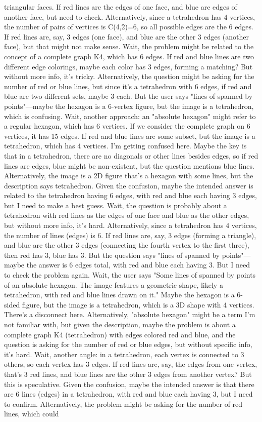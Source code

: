 triangular faces. If red lines are the edges of one face, and blue are edges of another face, but need to check. Alternatively, since a tetrahedron has 4 vertices, the number of pairs of vertices is C(4,2)=6, so all possible edges are the 6 edges. If red lines are, say, 3 edges (one face), and blue are the other 3 edges (another face), but that might not make sense. Wait, the problem might be related to the concept of a complete graph K4, which has 6 edges. If red and blue lines are two different edge colorings, maybe each color has 3 edges, forming a matching? But without more info, it's tricky. Alternatively, the question might be asking for the number of red or blue lines, but since it's a tetrahedron with 6 edges, if red and blue are two different sets, maybe 3 each. But the user says "lines of spanned by points"—maybe the hexagon is a 6-vertex figure, but the image is a tetrahedron, which is confusing. Wait, another approach: an "absolute hexagon" might refer to a regular hexagon, which has 6 vertices. If we consider the complete graph on 6 vertices, it has 15 edges. If red and blue lines are some subset, but the image is a tetrahedron, which has 4 vertices. I'm getting confused here. Maybe the key is that in a tetrahedron, there are no diagonals or other lines besides edges, so if red lines are edges, blue might be non-existent, but the question mentions blue lines. Alternatively, the image is a 2D figure that's a hexagon with some lines, but the description says tetrahedron. Given the confusion, maybe the intended answer is related to the tetrahedron having 6 edges, with red and blue each having 3 edges, but I need to make a best guess. Wait, the question is probably about a tetrahedron with red lines as the edges of one face and blue as the other edges, but without more info, it's hard. Alternatively, since a tetrahedron has 4 vertices, the number of lines (edges) is 6. If red lines are, say, 3 edges (forming a triangle), and blue are the other 3 edges (connecting the fourth vertex to the first three), then red has 3, blue has 3. But the question says "lines of spanned by points"—maybe the answer is 6 edges total, with red and blue each having 3. But I need to check the problem again. Wait, the user says "Some lines of spanned by points of an absolute hexagon. The image features a geometric shape, likely a tetrahedron, with red and blue lines drawn on it." Maybe the hexagon is a 6-sided figure, but the image is a tetrahedron, which is a 3D shape with 4 vertices. There's a disconnect here. Alternatively, "absolute hexagon" might be a term I'm not familiar with, but given the description, maybe the problem is about a complete graph K4 (tetrahedron) with edges colored red and blue, and the question is asking for the number of red or blue edges, but without specific info, it's hard. Wait, another angle: in a tetrahedron, each vertex is connected to 3 others, so each vertex has 3 edges. If red lines are, say, the edges from one vertex, that's 3 red lines, and blue lines are the other 3 edges from another vertex? But this is speculative. Given the confusion, maybe the intended answer is that there are 6 lines (edges) in a tetrahedron, with red and blue each having 3, but I need to confirm. Alternatively, the problem might be asking for the number of red lines, which could 